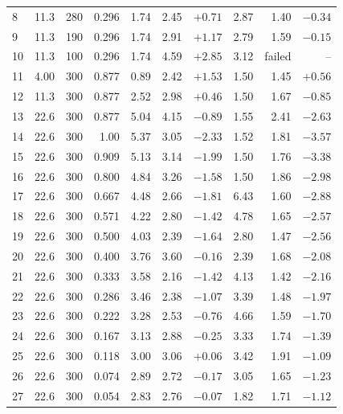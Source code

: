 \begin{table}[htbp]
\begin{tabular}{lrrrrrrrrr}
          8 & 11.3 &  280 & 0.296 &  1.74 &  2.45 &   $+0.71$ &  2.87 &   1.40 &   $-0.34$ \\
          9 & 11.3 &  190 & 0.296 &  1.74 &  2.91 &   $+1.17$ &  2.79 &   1.59 &   $-0.15$ \\
        10 & 11.3 &  100 & 0.296 &  1.74 &  4.59 &   $+2.85$ &  3.12 & failed &        -- \\
        11 &  4.00 &  300 & 0.877 &  0.89 &  2.42 &   $+1.53$ &  1.50 &   1.45 &   $+0.56$ \\
        12 & 11.3 &  300 & 0.877 &  2.52 &  2.98 &   $+0.46$ &  1.50 &   1.67 &   $-0.85$ \\
        13 & 22.6 &  300 & 0.877 &  5.04 &  4.15 &   $-0.89$ &  1.55 &   2.41 &   $-2.63$ \\
        \midrule
        14 & 22.6 &  300 & 1.00 &  5.37 &  3.05 &   $-2.33$ &  1.52 &   1.81 &   $-3.57$ \\
        15 & 22.6 &  300 & 0.909 &  5.13 &  3.14 &   $-1.99$ &  1.50 &   1.76 &   $-3.38$ \\
        16 & 22.6 &  300 & 0.800 &  4.84 &  3.26 &   $-1.58$ &  1.50 &   1.86 &   $-2.98$ \\
        17 & 22.6 &  300 & 0.667 &  4.48 &  2.66 &   $-1.81$ &  6.43 &   1.60 &   $-2.88$ \\
        18 & 22.6 &  300 & 0.571 &  4.22 &  2.80 &   $-1.42$ &  4.78 &   1.65 &   $-2.57$ \\
        19 & 22.6 &  300 & 0.500 &  4.03 &  2.39 &   $-1.64$ &  2.80 &   1.47 &   $-2.56$ \\
        20 & 22.6 &  300 & 0.400 &  3.76 &  3.60 &   $-0.16$ &  2.39 &   1.68 &   $-2.08$ \\
        21 & 22.6 &  300 & 0.333 &  3.58 &  2.16 &   $-1.42$ &  4.13 &   1.42 &   $-2.16$ \\
        22 & 22.6 &  300 & 0.286 &  3.46 &  2.38 &   $-1.07$ &  3.39 &   1.48 &   $-1.97$ \\
        23 & 22.6 &  300 & 0.222 &  3.28 &  2.53 &   $-0.76$ &  4.66 &   1.59 &   $-1.70$ \\
        24 & 22.6 &  300 & 0.167 &  3.13 &  2.88 &   $-0.25$ &  3.33 &   1.74 &   $-1.39$ \\
        25 & 22.6 &  300 & 0.118 &  3.00 &  3.06 &   $+0.06$ &  3.42 &   1.91 &   $-1.09$ \\
        26 & 22.6 &  300 & 0.074 &  2.89 &  2.72 &   $-0.17$ &  3.05 &   1.65 &   $-1.23$ \\
        27 & 22.6 &  300 & 0.054 &  2.83 &  2.76 &   $-0.07$ &  1.82 &   1.71 &   $-1.12$ \\

\end{tabular}
\end{table}
